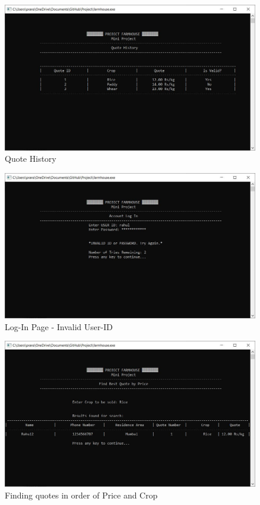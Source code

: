 \documentclass[12pt]{article}
\begin{document}
\begin{figure}[h!]
    \centering
    \includegraphics[width = \columnwidth]{ScreenShots/Buyer_5.JPG}
    \caption{Quote History}
\end{figure}

\begin{figure}[h!]
    \centering
    \includegraphics[width = \columnwidth]{ScreenShots/login.JPG}
    \caption{Log-In Page - Invalid User-ID}
\end{figure}

\begin{figure}[h!]
    \centering
    \includegraphics[width = \columnwidth]{ScreenShots/Farmer_4.JPG}
    \caption{Finding quotes in order of Price and Crop}
\end{figure}
\end{document}
